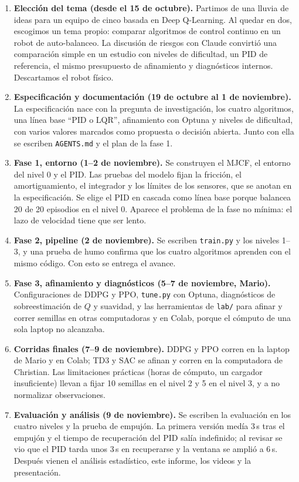 \documentclass[11pt,a4paper]{article}
\newcommand{\code}[1]{\texttt{#1}}
\newcommand{\SI}[2]{#1\,#2}  %
\begin{document}
\begin{enumerate}
  \item \textbf{Elección del tema (desde el 15 de octubre).} Partimos de una lluvia de ideas para un equipo de cinco basada en Deep Q-Learning. Al quedar en dos, escogimos un tema propio: comparar algoritmos de control continuo en un robot de auto-balanceo. La discusión de riesgos con Claude convirtió una comparación simple en un estudio con niveles de dificultad, un PID de referencia, el mismo presupuesto de afinamiento y diagnósticos internos. Descartamos el robot físico.
  \item \textbf{Especificación y documentación (19 de octubre al 1 de noviembre).} La especificación nace con la pregunta de investigación, los cuatro algoritmos, una línea base ``PID o LQR'', afinamiento con Optuna y niveles de dificultad, con varios valores marcados como propuesta o decisión abierta. Junto con ella se escriben \code{AGENTS.md} y el plan de la fase 1.
  \item \textbf{Fase 1, entorno (1--2 de noviembre).} Se construyen el MJCF, el entorno del nivel 0 y el PID. Las pruebas del modelo fijan la fricción, el amortiguamiento, el integrador y los límites de los sensores, que se anotan en la especificación. Se elige el PID en cascada como línea base porque balancea 20 de 20 episodios en el nivel 0. Aparece el problema de la fase no mínima: el lazo de velocidad tiene que ser lento.
  \item \textbf{Fase 2, pipeline (2 de noviembre).} Se escriben \code{train.py} y los niveles 1--3, y una prueba de humo confirma que los cuatro algoritmos aprenden con el mismo código. Con esto se entrega el avance.
  \item \textbf{Fase 3, afinamiento y diagnósticos (5--7 de noviembre, Mario).} Configuraciones de DDPG y PPO, \code{tune.py} con Optuna, diagnósticos de sobreestimación de $Q$ y suavidad, y las herramientas de \code{lab/} para afinar y correr semillas en otras computadoras y en Colab, porque el cómputo de una sola laptop no alcanzaba.
  \item \textbf{Corridas finales (7--9 de noviembre).} DDPG y PPO corren en la laptop de Mario y en Colab; TD3 y SAC se afinan y corren en la computadora de Christian. Las limitaciones prácticas (horas de cómputo, un cargador insuficiente) llevan a fijar 10 semillas en el nivel 2 y 5 en el nivel 3, y a no normalizar observaciones.
  \item \textbf{Evaluación y análisis (9 de noviembre).} Se escriben la evaluación en los cuatro niveles y la prueba de empujón. La primera versión medía \SI{3}{s} tras el empujón y el tiempo de recuperación del PID salía indefinido; al revisar se vio que el PID tarda unos \SI{3}{s} en recuperarse y la ventana se amplió a \SI{6}{s}. Después vienen el análisis estadístico, este informe, los videos y la presentación.
\end{enumerate}
\end{document}
